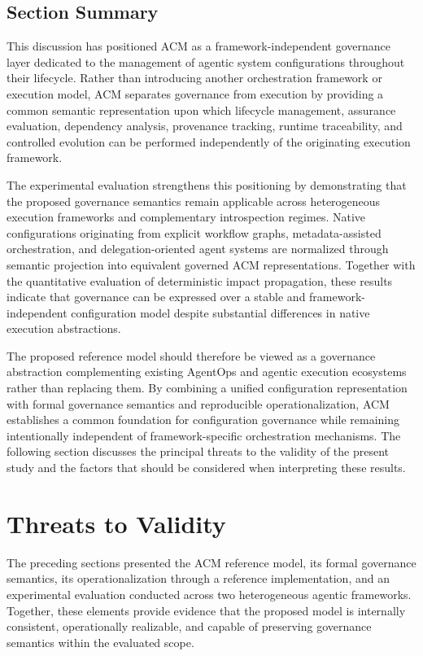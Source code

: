 \documentclass[10pt]{article}
\begin{document}
\subsection{Section Summary}

This discussion has positioned ACM as a framework-independent governance layer dedicated to the management of agentic system configurations throughout their lifecycle. Rather than introducing another orchestration framework or execution model, ACM separates governance from execution by providing a common semantic representation upon which lifecycle management, assurance evaluation, dependency analysis, provenance tracking, runtime traceability, and controlled evolution can be performed independently of the originating execution framework.

The experimental evaluation strengthens this positioning by demonstrating that the proposed governance semantics remain applicable across heterogeneous execution frameworks and complementary introspection regimes. Native configurations originating from explicit workflow graphs, metadata-assisted orchestration, and delegation-oriented agent systems are normalized through semantic projection into equivalent governed ACM representations. Together with the quantitative evaluation of deterministic impact propagation, these results indicate that governance can be expressed over a stable and framework-independent configuration model despite substantial differences in native execution abstractions.

The proposed reference model should therefore be viewed as a governance abstraction complementing existing AgentOps and agentic execution ecosystems rather than replacing them. By combining a unified configuration representation with formal governance semantics and reproducible operationalization, ACM establishes a common foundation for configuration governance while remaining intentionally independent of framework-specific orchestration mechanisms. The following section discusses the principal threats to the validity of the present study and the factors that should be considered when interpreting these results.

\section{Threats to Validity}
\label{sec:threats_validity}

The preceding sections presented the ACM reference model, its formal governance semantics, its operationalization through a reference implementation, and an experimental evaluation conducted across two heterogeneous agentic frameworks. Together, these elements provide evidence that the proposed model is internally consistent, operationally realizable, and capable of preserving governance semantics within the evaluated scope.
\end{document}
